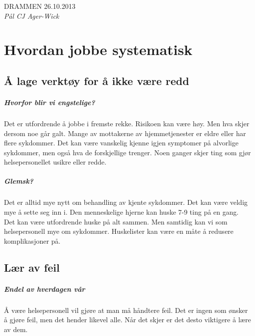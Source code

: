 \documentclass[a4paper,12pt,twoside]{memoir}
\begin{document}
				DRAMMEN 26.10.2013\\[0.4in]

				\emph{Pål CJ Ager-Wick}

	\newpage
	\tableofcontents


\mainmatter
	\chapter{Hvordan jobbe systematisk}
		\section{Å lage verktøy for å ikke være redd}
			\paragraph{Hvorfor blir vi engstelige?\\}
				Det er utfordrende å jobbe i fremste rekke. Risikoen kan være høy. Men hva skjer dersom noe går galt. Mange av mottakerne av hjemmetjenester er eldre eller har flere sykdommer. Det kan være vanskelig kjenne igjen symptomer på alvorlige sykdommer, men også hva de forskjellige trenger. Noen ganger skjer ting som gjør helsepersonellet usikre eller redde.
			\paragraph{Glemsk?\\}
				Det er alltid mye nytt om behandling av kjente sykdommer. Det kan være veldig mye å sette seg inn i. Den menneskelige hjerne kan huske 7-9 ting på en gang. Det kan være utfordrende huske på alt sammen. Men samtidig kan vi som helsepersonell mye om sykdommer. Huskelister kan være en måte å redusere komplikasjoner på\cite{FA-gawande}.
		\section{Lær av feil}
			\paragraph{Endel av hverdagen vår\\}
				Å være helsepersonell vil gjøre at man må håndtere feil. Det er ingen som ønsker å gjøre feil, men det hender likevel alle. Når det skjer er det desto viktigere å lære av dem.
\end{document}
